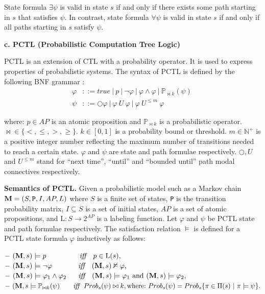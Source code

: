 \noindent State formula $\exists \psi$ is valid in state $s$ if and only if there exists some path starting in $s$ that satisfies $\psi$. In contrast, state formula $\forall \psi$ is valid in state $s$ if and only if all paths starting in $s$ satisfy $\psi$.

\noindent \textbf{c. PCTL (Probabilistic Computation Tree Logic)}

PCTL \cite{Hansson1994} is an extension of CTL with a probability operator. It is used to express properties of probabilistic systems. The syntax of PCTL is defined by the following BNF grammar \cite{Baier2008}:
%
\begin{align*}
    \varphi & ::= true ~|~p~|~\neg \varphi~|~\varphi \wedge \varphi~|~ \mathbb{P}_{\bowtie k} (\psi)~\\
    \psi & ::=\bigcirc \varphi ~ | ~ \varphi ~U~ \varphi~|~ \varphi~ U^{\leq m} ~ \varphi
\end{align*}

\noindent where: $p\in AP$ is an atomic proposition and $\mathbb{P}_{\bowtie k}$ is a probabilistic operator. $\bowtie \in\{<,\leq,>,\ge\}$. $k\in [0,1]$ is a probability bound or threshold. $m \in\mathbb{N}^+ $ is a positive integer number reflecting the maximum number of transitions needed to reach a certain state. $\varphi$ and $\psi$ are state and path formulae respectively. $\bigcirc, U$ and $U^{\leq m}$ stand for ``next time'',
``until'' and ``bounded until'' path modal connectives respectively.

\noindent \textbf{Semantics of PCTL.} Given a probabilistic model such as a Markov chain $\textbf{M} =(S,\verb"P",I,AP,L)$ where $S$ is a finite set of states, \verb"P" is the transition probability matrix, $I\subseteq S$ is a set of initial states, $AP$ is a set of atomic propositions, and $\mathrm{L}: S \to 2^{AP}$ is a labeling function. Let $\varphi$ and $\psi$ be PCTL state and path formulae respectively. The satisfaction relation $\models$ is defined for a PCTL state formula $\varphi$ inductively as follows:

\noindent $-~(\textbf{M},s) \models p ~~~~~~~~~~~~~~\emph{iff}~~~ p\in \mathrm{L}(s),$\\
$-~(\textbf{M},s) \models \neg \varphi ~~~~~~~~~~~\emph{iff}~~~ (\textbf{M},s)\nvDash \varphi,$\\
$-~(\textbf{M},s) \models \varphi_1 \wedge \varphi_2 ~~~~~\emph{iff}~~~(\textbf{M},s)\models \varphi_1~\textrm{and}~(\textbf{M},s) \models \varphi_2,$ \\
$-~(\textbf{M},s \models \mathbb{P}_{\bowtie k} (\psi)~~~~~~\emph{iff}~~Prob_s(\psi)\bowtie k, \textrm{where:}~Prob_s(\psi)=Prob_s\{\pi \in \Pi(s)~|~\pi\models
\psi\}.$

